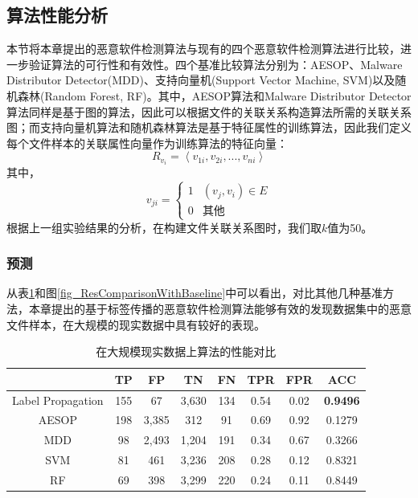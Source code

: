\subsection{算法性能分析}
本节将本章提出的恶意软件检测算法与现有的四个恶意软件检测算法进行比较，进一步验证算法的可行性和有效性。四个基准比较算法分别为：AESOP\cite{tamersoy2014guilt}、Malware Distributor Detector(MDD)\cite{venzhega2013graph}、支持向量机(Support Vector Machine, SVM)以及随机森林(Random Forest, RF)。其中，AESOP算法和Malware Distributor Detector算法同样是基于图的算法，因此可以根据文件的关联关系构造算法所需的关联关系图；而支持向量机算法和随机森林算法是基于特征属性的训练算法，因此我们定义每个文件样本的关联属性向量作为训练算法的特征向量：
\begin{equation}
R_{v_{i}}=\left \langle v_{1i},v_{2i},...,v_{ni}\right \rangle
\end{equation}
其中，
\begin{equation}
v_{ji}=\left\{\begin{matrix}
1 & (v_{j},v_{i}) \in E\\ 
0 & \text{其他}
\end{matrix}\right.
\end{equation}
根据上一组实验结果的分析，在构建文件关联关系图时，我们取$k$值为50。

\subsubsection{预测}
从表\ref{tb_ResComparisonWithBaseline}和图\ref{fig_ResComparisonWithBaseline}中可以看出，对比其他几种基准方法，本章提出的基于标签传播的恶意软件检测算法能够有效的发现数据集中的恶意文件样本，在大规模的现实数据中具有较好的表现。

\begin{table}[!ht]
\renewcommand{\arraystretch}{1.5}
\caption{在大规模现实数据上算法的性能对比}
\label{tb_ResComparisonWithBaseline}
\centering
\begin{tabular}{cccccccc}

\toprule
 & TP & FP & TN & FN & TPR & FPR & ACC\\
\midrule
Label Propagation & 155 & 67 & 3,630 & 134 & 0.54 & 0.02 & \textbf{0.9496}\\
AESOP & 198 & 3,385 & 312 & 91 & 0.69 & 0.92 & 0.1279 \\
MDD & 98 & 2,493 & 1,204 & 191 & 0.34 & 0.67 & 0.3266 \\
SVM & 81 & 461 & 3,236 & 208 & 0.28 & 0.12 & 0.8321\\
RF & 69 & 398 & 3,299 & 220 & 0.24 & 0.11 & 0.8449 \\
\bottomrule
\end{tabular}
\end{table}

